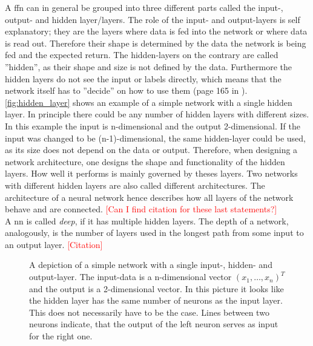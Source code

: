 A \gls{ffn} can in general be grouped into three different parts called the input-, output- and hidden layer/layers. The role of the input- and output-layers is self explanatory; they are the layers where data is fed into the network or where data is read out. Therefore their shape is determined by the data the network is being fed and the expected return. The hidden-layers on the contrary are called ''hidden'', as their shape and size is not defined by the data. Furthermore the hidden layers do not see the input or labels directly, which means that the network itself has to ''decide'' on how to use them (page 165 in \cite{deep_learning_book}). \autoref{fig:hidden_layer} shows an example of a simple network with a single hidden layer. In principle there could be any number of hidden layers with different sizes. In this example the input is n-dimensional and the output 2-dimensional. If the input was changed to be (n-1)-dimensional, the same hidden-layer could be used, as its size does not depend on the data or output. Therefore, when designing a network architecture, one designs the shape and functionality of the hidden layers. How well it performs is mainly governed by theses layers. Two networks with different hidden layers are also called different architectures. The architecture of a neural network hence describes how all layers of the network behave and are connected. \textcolor{red}{[Can I find citation for these last statements?]}\\
A \gls{nn} is called \emph{deep}, if it has multiple hidden layers. The depth of a network, analogously, is the number of layers used in the longest path from some input to an output layer. \textcolor{red}{[Citation]}
\begin{figure}
\centering

\caption[Simple neural network]{A depiction of a simple network with a single input-, hidden- and output-layer. The input-data is a n-dimensional vector ${(x_1, \dotsc, x_n)}^T$ and the output is a 2-dimensional vector. In this picture it looks like the hidden layer has the same number of neurons as the input layer. This does not necessarily have to be the case. Lines between two neurons indicate, that the output of the left neuron serves as input for the right one.}\label{fig:hidden_layer}
\end{figure}

